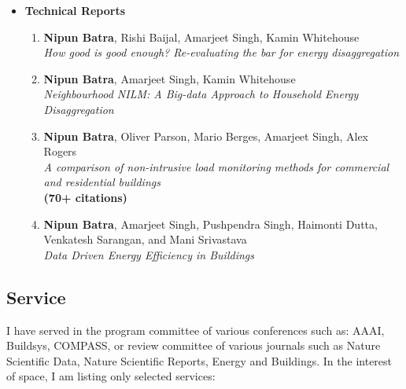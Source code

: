 \documentclass[letter,10pt]{article}
\begin{document}
\begin{itemize}
\begin{enumerate}
\end{enumerate}

\item[]\textbf{Technical Reports}
    \begin{enumerate}
    \item 
    {\textbf{Nipun Batra}, Rishi Baijal, Amarjeet Singh, Kamin Whitehouse}\\
    \textit{How good is good enough? Re-evaluating
	the bar for energy disaggregation}

\item {\textbf{Nipun Batra},  Amarjeet Singh, Kamin Whitehouse} \\ 
\textit{Neighbourhood NILM: A Big-data Approach to Household
	Energy Disaggregation}

\item {\textbf{Nipun Batra},  Oliver Parson, Mario Berges, Amarjeet Singh, Alex Rogers} \\ 
\textit{A comparison of non-intrusive load monitoring methods for commercial and residential buildings} \\ 
{\textbf{(70+ citations)}}

\item {\textbf{Nipun Batra},  Amarjeet Singh, Pushpendra Singh, Haimonti Dutta, Venkatesh Sarangan, and Mani Srivastava} \\
\textit{Data Driven Energy Efficiency in Buildings}
    
    \end{enumerate}
    
    
    
\end{itemize}


\subsection*{\textbf{Service}}
\vspace{-0.4em}
I have served in the program committee of various conferences such as: AAAI, Buildsys, COMPASS, or review committee of various journals such as Nature Scientific Data, Nature Scientific Reports, Energy and Buildings. In the interest of space, I am listing only selected services:
\end{document}

